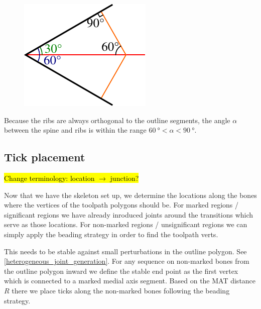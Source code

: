 \begin{figure}
\begin{center}
\includegraphics[width=\linewidth]{sources/method/min_angle_of_introduced_bones.pdf}
\end{center}
\end{figure}

Because the ribs are always orthogonal to the outline segments, the angle $\alpha$ between the spine and ribs is within the range $\SI{60}{\degree} < \alpha < \SI{90}{\degree}$.













\subsection{Tick placement}
\hl{Change terminology: location $\to$ junction?}

Now that we have the skeleton set up, we determine the locations along the bones where the vertices of the toolpath polygons should be.
For marked regions / significant regions we have already inroduced joints around the transitions which serve as those locations.
For non-marked regions / unsignificant regions we can simply apply the beading strategy in order to find the toolpath verts.


This needs to be stable against small perturbations in the outline polygon.
See \cref{heterogeneous_joint_generation}.
For any sequence on non-marked bones from the outline polygon inward we define the stable end point as the first vertex which is connected to a marked medial axis segment.
Based on the MAT distance $R$ there we place ticks along the non-marked bones following the beading strategy.

